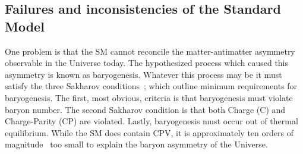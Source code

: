 \subsection{Failures and inconsistencies of the Standard Model}
One problem is that the SM cannot reconcile the matter-antimatter asymmetry observable in the
Universe today.
The hypothesized process which caused this asymmetry is known as baryogenesis.
Whatever this process may be it must satisfy the three Sakharov
conditions~\cite{1991SvPhU..34..392S}; which outline minimum requirements for baryogenesis.
The first, most obvious, criteria is that baryogenesis must violate baryon number.
The second Sakharov condition is that both Charge (C) and Charge-Parity (CP) are violated.
Lastly, baryogenesis must occur out of thermal equilibrium.
While the SM does contain CPV, it is approximately ten orders of
magnitude~\cite{Cline:2006ts,Huet:1994jb} too small to explain the baryon asymmetry of the
Universe.

